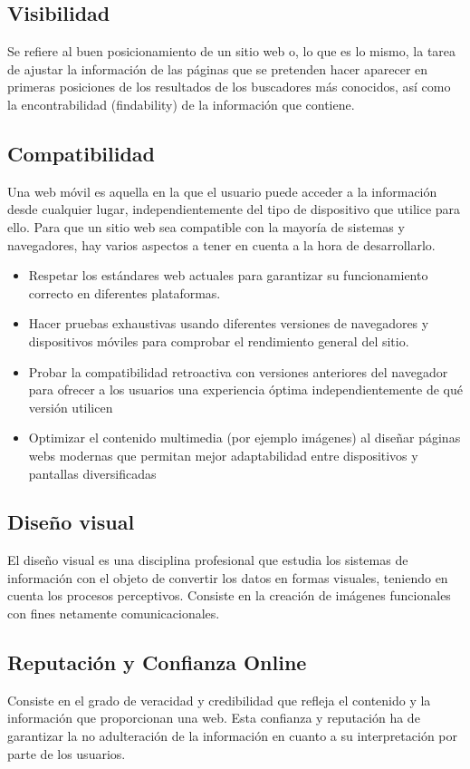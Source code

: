 \documentclass[12pt]{article}
\begin{document}
\subsection*{Visibilidad}
Se refiere al buen posicionamiento de un sitio web o, lo que es lo mismo, la tarea de ajustar la información de las páginas que se pretenden hacer aparecer en primeras posiciones de los resultados de los buscadores más conocidos, así como la encontrabilidad (findability) de la información que contiene.

\subsection*{Compatibilidad}
Una web móvil es aquella en la que el usuario puede acceder a la información desde cualquier lugar, independientemente del tipo de dispositivo que utilice para ello.
Para que un sitio web sea compatible con la mayoría de sistemas y navegadores, hay varios aspectos a tener en cuenta a la hora de desarrollarlo.

\begin{itemize}
    \item Respetar los estándares web actuales para garantizar su funcionamiento correcto en diferentes plataformas.
    \item Hacer pruebas exhaustivas usando diferentes versiones de navegadores y dispositivos móviles para comprobar el rendimiento general del sitio.
    \item Probar la compatibilidad retroactiva con versiones anteriores del navegador para ofrecer a los usuarios una experiencia óptima independientemente de qué versión utilicen
    \item Optimizar el contenido multimedia (por ejemplo imágenes) al diseñar páginas webs modernas que permitan mejor adaptabilidad entre dispositivos y pantallas diversificadas
\end{itemize}

\subsection*{Diseño visual}
El diseño visual es una disciplina profesional que estudia los sistemas de información con el objeto de convertir los datos en formas visuales, teniendo en cuenta los procesos perceptivos. Consiste en la creación de imágenes funcionales con fines
netamente comunicacionales.

\subsection*{Reputación y Confianza Online}
Consiste en el grado de veracidad y credibilidad que refleja el contenido y la información que proporcionan una web. Esta confianza y reputación ha de garantizar la no adulteración de la información en cuanto a su interpretación por parte de los usuarios.
\end{document}
